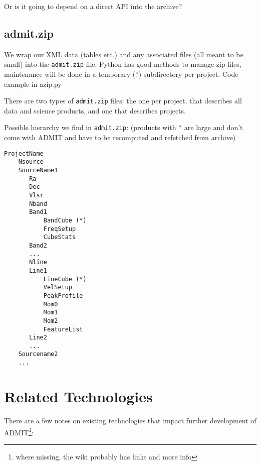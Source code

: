 \documentclass[preprint]{aastex} %
\begin{document}
Or is it going to depend on a direct API into the archive?  


\subsection{admit.zip}

We wrap our XML data (tables etc.) and any associated files (all meant to be small)
into the {\tt admit.zip} file.
Python has good methods to manage zip files, maintenance will be done in 
a temporary (?) subdirectory per project. Code example in azip.py

There are two types of {\tt admit.zip} files: the one per project, that describes
all data and science products, and one that describes projects.

Possible hierarchy we find in {\tt admit.zip}: (products with * are large and don't come
with ADMIT and have to be recomputed and refetched from archive)
\footnotesize
\begin{verbatim}
ProjectName
    Nsource
    SourceName1
       Ra
       Dec
       Vlsr
       Nband
       Band1
           BandCube (*)
           FreqSetup
           CubeStats
       Band2
       ...
       Nline
       Line1
           LineCube (*)
           VelSetup
           PeakProfile
           Mom0
           Mom1
           Mom2
           FeatureList
       Line2
       ...
    Sourcename2
    ...    
\end{verbatim}
\normalsize


\section{Related Technologies}

There are a few notes on existing technologies that 
impact further development of ADMIT\footnote{where missing, the wiki probably has 
links and more info}:
\end{document}
